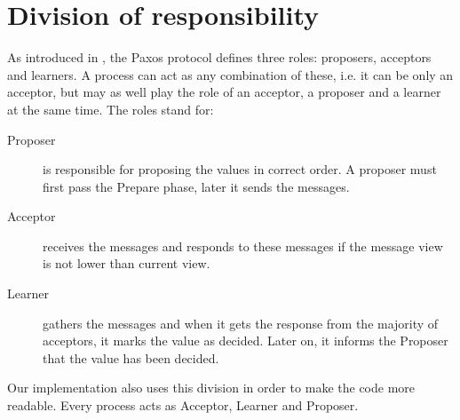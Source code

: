 \section{Division of responsibility}

As introduced in \cite{Lam01}, the Paxos protocol defines three roles: proposers, acceptors and learners.
A process can act as any combination of these, i.e. it can be only an acceptor, but may as well play the role of an acceptor, a proposer and a learner at the same time. The roles stand for:
\begin{description}
 \item[Proposer] is responsible for proposing the values in correct order. A proposer must first pass the Prepare phase, later it sends the \propose messages.
 
 \item[Acceptor] receives the \propose messages and responds to these messages if the message view is not lower than current view.
 
 \item[Learner] gathers the \accept messages and when it gets the response from the majority of acceptors, it marks the value as decided. Later on, it informs the Proposer that the value has been decided.
\end{description}

Our implementation also uses this division in order to make the code more readable. Every process acts as Acceptor, Learner and Proposer.

